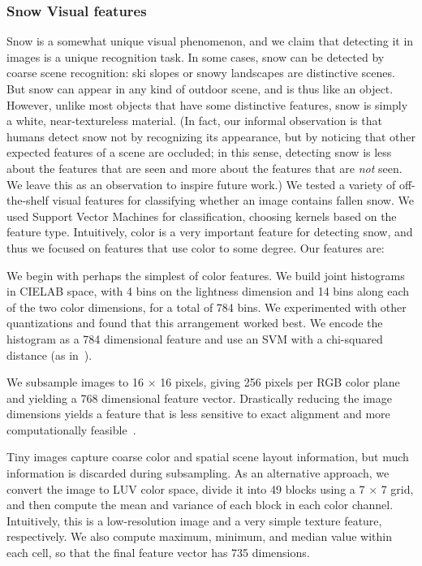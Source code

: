 \documentclass[10pt,journal,compsoc]{IEEEtran}
\begin{document}
\subsubsection{Snow Visual features}
Snow is a somewhat unique visual phenomenon, and we claim that
detecting it in images is a unique recognition task. In some cases,
snow can be detected by coarse scene recognition: ski slopes or snowy
landscapes are distinctive scenes. But snow can appear in any kind of
outdoor scene, and is thus like an object. However, unlike most
objects that have some distinctive features, snow is simply a white,
near-textureless material.  (In fact, our informal observation is that
humans detect snow not by recognizing its appearance, but by noticing
that other expected features of a scene are occluded; in this sense,
detecting snow is less about the features that are seen and more about
the features that are \textit{not} seen. We leave this as an
observation to inspire future work.)
%
We tested a variety of off-the-shelf visual features for classifying
whether an image contains fallen snow. We used Support Vector
Machines for classification, choosing kernels based on the feature
type.  Intuitively, color is a very important feature for detecting
snow, and thus we focused on features that use color to some
degree. Our features are:


 We begin with perhaps the simplest of color
features. We build joint histograms in CIELAB space, with 4 bins on
the lightness dimension and 14 bins along each of the two color
dimensions, for a total of 784 bins. We experimented with other
quantizations and found that this arrangement worked best.  We encode
the histogram as a 784 dimensional feature and use an SVM with a
chi-squared distance (as in~\cite{XiaoHEOT10}).

We subsample images to 16 $\times$ 16 pixels, giving 256 pixels per
RGB color plane and yielding a 768 dimensional feature vector.
Drastically reducing the image dimensions yields a feature that is
less sensitive to exact alignment and more computationally
feasible~\cite{torralba2008tiny}.  


 Tiny images capture coarse color and spatial
scene layout information, but much information is discarded during
subsampling.  As an alternative approach, we convert the image to LUV
color space, divide it into 49 blocks using a 7 $\times$ 7 grid, and
then compute the mean and variance of each block in each color
channel.  Intuitively, this is a low-resolution image and a very
simple texture feature, respectively.  We also compute maximum,
minimum, and median value within each cell, so that the final
feature vector has 735 dimensions.
\end{document}
